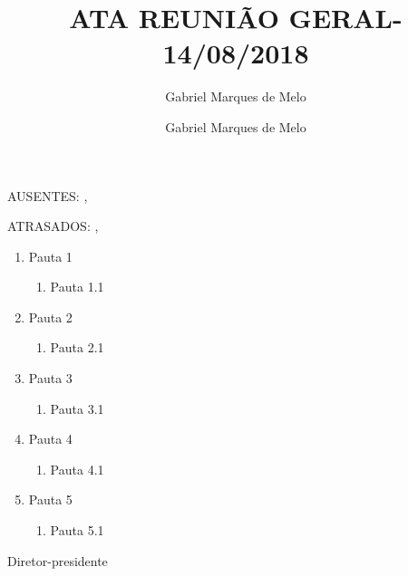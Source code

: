





\def\reuniao{REUNIÃO GERAL}
\def\data{14/08/2018}
\def\titulo{ATA \reuniao - \data}
\def\ausentes{AUSENTES: \gabrielmelo, \isaias}
\def\atrasados{ATRASADOS: \viniciuspimenta, \franciscone}

\title{\titulo}
\date{}
\author{Gabriel Marques de Melo}


    \initdoc

	\ausentes

    \atrasados

    \begin{enumerate}
    	\item Pauta 1
    	\begin{enumerate}
    		\item Pauta 1.1
    	\end{enumerate}
    	\item Pauta 2
    	\begin{enumerate}
    		\item Pauta 2.1
    	\end{enumerate}
    	\item Pauta 3
    	\begin{enumerate}
    		\item Pauta 3.1
    	\end{enumerate}
    	\item Pauta 4
    	\begin{enumerate}
    		\item Pauta 4.1
    	\end{enumerate}
    	\item Pauta 5
    	\begin{enumerate}
    		\item Pauta 5.1
    	\end{enumerate}

    \end{enumerate}

    \vfill

    \signature{Gabriel Marques de Melo}{Diretor-presidente}

